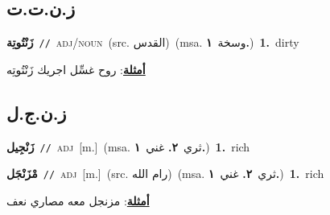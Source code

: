 \documentclass[10pt,a4paper,twoside]{article} %
\begin{document}
\begin{multicols}{2}
\vspace{-3mm}
\subsection*{\color{blue}\foreignlanguage{arabic}{ز.ن.ت.ت}\color{blue}{ (ntws)}} 

{\setlength\topsep{0pt}\textbf{\foreignlanguage{arabic}{زَنْتُوتِة}}\ {\color{gray}\texttt{//}\color{black}}\ \textsc{adj/noun}\ (src. \color{gray}\foreignlanguage{arabic}{القدس}\color{black})\ \color{gray}(msa. \foreignlanguage{arabic}{وسخة}~\foreignlanguage{arabic}{\textbf{١.}})\color{black}\ \textbf{1.}~dirty\  \begin{flushright}\color{gray}\foreignlanguage{arabic}{\textbf{\underline{\foreignlanguage{arabic}{أمثلة}}}: روح غسِّل اجريك زَنْتُوتِه}\end{flushright}\color{black}} \vspace{2mm}

\vspace{-3mm}
\subsection*{\color{blue}\foreignlanguage{arabic}{ز.ن.ج.ل}\color{blue}{ (ntws)}} 

{\setlength\topsep{0pt}\textbf{\foreignlanguage{arabic}{زَنْجِيل}}\ {\color{gray}\texttt{//}\color{black}}\ \textsc{adj}\ [m.]\ \color{gray}(msa. \foreignlanguage{arabic}{ثري}~\foreignlanguage{arabic}{\textbf{٢.}}  \foreignlanguage{arabic}{غني}~\foreignlanguage{arabic}{\textbf{١.}})\color{black}\ \textbf{1.}~rich\ } \vspace{2mm}

{\setlength\topsep{0pt}\textbf{\foreignlanguage{arabic}{مْزَنْجَل}}\ {\color{gray}\texttt{//}\color{black}}\ \textsc{adj}\ [m.]\ (src. \color{gray}\foreignlanguage{arabic}{رام الله}\color{black})\ \color{gray}(msa. \foreignlanguage{arabic}{ثري}~\foreignlanguage{arabic}{\textbf{٢.}}  \foreignlanguage{arabic}{غني}~\foreignlanguage{arabic}{\textbf{١.}})\color{black}\ \textbf{1.}~rich\  \begin{flushright}\color{gray}\foreignlanguage{arabic}{\textbf{\underline{\foreignlanguage{arabic}{أمثلة}}}: مزنجل معه مصاري نعف}\end{flushright}\color{black}} \vspace{2mm}


\end{multicols}
\end{document}
